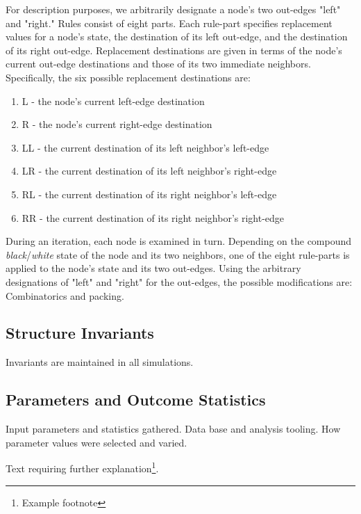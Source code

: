 \documentclass[twoside,twocolumn]{article}
\begin{document}
For description purposes, we arbitrarily designate a node's two out-edges "left" and "right."
Rules consist of eight parts. Each rule-part specifies replacement values for
a node's state, the destination of its left out-edge, and the destination of its right
out-edge. Replacement destinations are given in terms of the node's current out-edge destinations
and those of its two immediate neighbors. Specifically, the six possible replacement
destinations are:

\begin{enumerate}
    \item L - the node's current left-edge destination
    \item R - the node's current right-edge destination
    \item LL - the current destination of its left neighbor's left-edge
    \item LR - the current destination of its left neighbor's right-edge
    \item RL - the current destination of its right neighbor's left-edge
    \item RR - the current destination of its right neighbor's right-edge
\end{enumerate}

During an iteration, each node is examined in turn. Depending on the compound \textit{black}/\textit{white}
state of the node and its two neighbors, one of the eight rule-parts is applied to
the node's state and its two out-edges. Using the arbitrary designations of "left" and "right"
for the out-edges, the possible modifications are:
Combinatorics and packing.

\subsection{Structure Invariants}

Invariants are maintained in all simulations.

\subsection{Parameters and Outcome Statistics}

Input parameters and statistics gathered. Data base and analysis tooling.
How parameter values were selected and varied.

Text requiring further explanation\footnote{Example footnote}.

\end{document}
